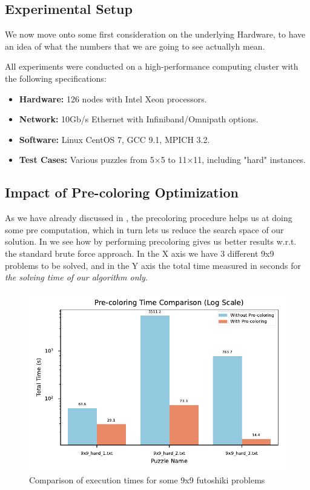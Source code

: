 \subsection{Experimental Setup}
We now move onto some first consideration on the underlying Hardware, to have an idea of what the numbers that we are going to see actuallyh mean.

All experiments were conducted on a high-performance computing cluster with the following specifications:
\begin{itemize}
    \item \textbf{Hardware:} 126 nodes with Intel Xeon processors.
    \item \textbf{Network:} 10Gb/s Ethernet with Infiniband/Omnipath options.
    \item \textbf{Software:} Linux CentOS 7, GCC 9.1, MPICH 3.2.
    \item \textbf{Test Cases:} Various puzzles from 5×5 to 11×11, including "hard" instances.
\end{itemize}

\subsection{Impact of Pre-coloring Optimization}
\label{subsec:precoloring_performance}
As we have already discussed in , the precoloring procedure helps us at doing some pre computation, which in turn lets us reduce the search space of our solution. In  we see how by performing precoloring gives us better results w.r.t. the standard brute force approach. In the X axis we have 3 different 9x9 problems to be solved, and in the Y axis the total time measured in seconds for \textit{the solving time of our algorithm only}.

\begin{figure}[htbp]
\centering
\includegraphics[width=0.9\linewidth]{imgs/precoloring_comparison.pdf}
\caption{Comparison of execution times for some 9x9 futoshiki problems}
\label{fig:precoloring_improvement}
\end{figure}



